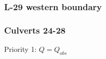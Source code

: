 \clearpage

\subsubsection{L-29 western boundary}


\clearpage
\subsubsection{Culverts 24-28}


\begin{packed_items}
\item Priority 1: $Q = Q_{obs}$
\end{packed_items}


%
%
%
%
%


